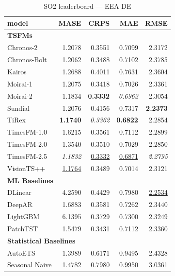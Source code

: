 \begin{table}[H]
\caption{SO2 leaderboard --- EEA DE}
\centering
\begin{small}
\begin{tabular}{lrrrr}
\toprule
model & MASE & CRPS & MAE & RMSE \\
\midrule
\multicolumn{5}{l}{\textbf{TSFMs}} \\
Chronos-2 & 1.2078 & 0.3551 & 0.7099 & 2.3172 \\
Chronos-Bolt & 1.2062 & 0.3488 & 0.7102 & 2.3785 \\
Kairos & 1.2688 & 0.4011 & 0.7631 & 2.3604 \\
Moirai-1 & 1.2075 & 0.3418 & 0.7026 & 2.3361 \\
Moirai-2 & 1.1834 & \textbf{0.3332} & \textit{0.6962} & 2.3054 \\
Sundial & 1.2076 & 0.4156 & 0.7317 & \textbf{2.2373} \\
TiRex & \textbf{1.1740} & \textit{0.3362} & \textbf{0.6822} & 2.2854 \\
TimesFM-1.0 & 1.6215 & 0.3561 & 0.7112 & 2.2899 \\
TimesFM-2.0 & 1.3540 & 0.3510 & 0.7029 & 2.2850 \\
TimesFM-2.5 & \textit{1.1832} & \underline{0.3332} & \underline{0.6871} & \textit{2.2795} \\
VisionTS++ & \underline{1.1764} & 0.3489 & 0.7014 & 2.3121 \\
\midrule
\multicolumn{5}{l}{\textbf{ML Baselines}} \\
DLinear & 4.2590 & 0.4429 & 0.7980 & \underline{2.2534} \\
DeepAR & 1.6883 & 0.3581 & 0.7262 & 2.3440 \\
LightGBM & 6.1395 & 0.3729 & 0.7300 & 2.3249 \\
PatchTST & 1.5479 & 0.3431 & 0.7112 & 2.3360 \\
\midrule
\multicolumn{5}{l}{\textbf{Statistical Baselines}} \\
AutoETS & 1.3989 & 0.6171 & 0.9495 & 2.4328 \\
Seasonal Naive & 1.4782 & 0.7980 & 0.9950 & 3.0361 \\
\bottomrule
\end{tabular}
\end{small}
\end{table}